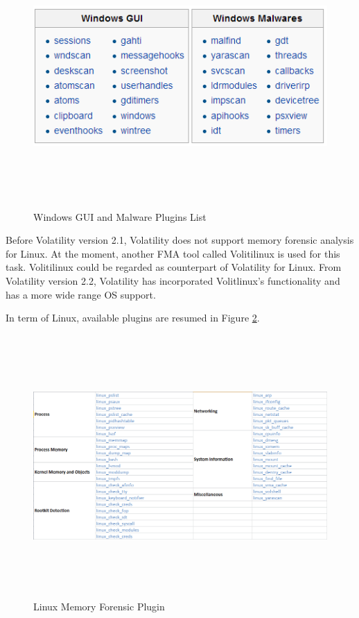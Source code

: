 \begin{figure}[htbp]
	\centering
		\includegraphics[width=14cm, height= 10cm ]{Figures/Figure24.png}
	\caption[Windows GUI and Malware Plugins List]{Windows GUI and Malware Plugins List}
	\label{fig:Windows GUI and Malware Plugins List}
\end{figure}

Before Volatility version 2.1, Volatility does not support memory forensic analysis for Linux. At the moment, another FMA tool called 
Volitilinux is used for this task. Volitilinux could be regarded as counterpart of Volatility for Linux. From Volatility version 2.2, 
Volatility has incorporated Volitlinux’s functionality and has a more wide range OS support.

In term of Linux, available plugins are resumed in Figure \ref{fig:Linux Memory Forensic Plugin}.
\begin{figure}[htbp]
	\centering
		\includegraphics[width=14cm, height= 10cm ]{Figures/Figure25.png}
	\caption[Linux Memory Forensic Plugin]{Linux Memory Forensic Plugin}
	\label{fig:Linux Memory Forensic Plugin}
\end{figure}

